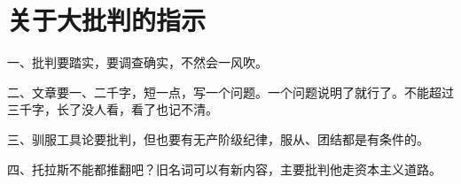 \section[关于大批判的指示（一九六七年三月）]{关于大批判的指示}


一、批判要踏实，要调查确实，不然会一风吹。

二、文章要一、二千字，短一点，写一个问题。一个问题说明了就行了。不能超过三千字，长了没人看，看了也记不清。

三、驯服工具论要批判，但也要有无产阶级纪律，服从、团结都是有条件的。

四、托拉斯不能都推翻吧？旧名词可以有新内容，主要批判他走资本主义道路。

